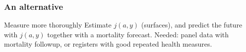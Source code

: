 \documentclass[20pt]{beamer}
\begin{document}
\begin{frame}
\frametitle{An alternative}
\begin{block}{Measure more thoroughly}
Estimate $j(a,y)$ (surfaces), and predict the future with $j(a,y)$ together with
a mortality forecast. Needed: panel data with mortality followup, or registers
with good repeated health measures.
\end{block}
\end{frame}
\end{document}

